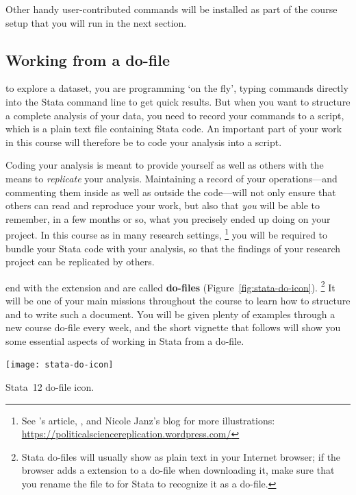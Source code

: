 Other handy user-contributed commands will be installed as part of the course setup that you will run in the next section.%

%
%
%
\subsection{Working from a do-file}%
  \label{sec:do-files}%

 to explore a dataset, you are programming `on the fly', typing commands directly into the Stata command line to get quick results. But when you want to structure a complete analysis of your data, you need to record your commands to a script, which is a plain text file containing Stata code. An important part of your work in this course will therefore be to code your analysis into a script.%
%

Coding your analysis is meant to provide yourself as well as others with the means to \emph{replicate} your analysis. Maintaining a record of your operations—and commenting them inside as well as outside the code—will not only ensure that others can read and reproduce your work, but also that \emph{you} will be able to remember, in a few months or so, what you precisely ended up doing on your project. In this course as in many research settings,%
  \footnote{See \citeauthor{King:1995}'s article, , and Nicole Janz's blog for more illustrations: \url{https://politicalsciencereplication.wordpress.com/}} %
  you will be required to bundle your Stata code with your analysis, so that the findings of your research project can be replicated by others. %

 end with the  extension and are called \textbf{do-files} (Figure~\ref{fig:stata-do-icon}).%
  \footnote{Stata do-files will usually show as plain text in your Internet browser; if the browser adds a  extension to a do-file when downloading it, make sure that you rename the file to  for Stata to recognize it as a do-file.} %
  It will be one of your main missions throughout the course to learn how to structure and to write such a document. You will be given plenty of examples through a new course do-file every week, and the short vignette that follows will show you some essential aspects of working in Stata from a do-file.%

\begin{marginfigure}
  \texttt{[image: stata-do-icon]}
  \caption{Stata~12 do-file icon.}
  \label{fig:stata-do-icon}
\end{marginfigure}

